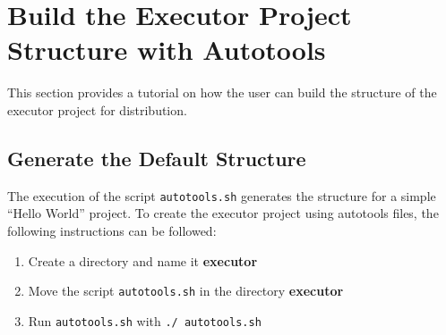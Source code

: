 
\section{Build the Executor Project Structure with Autotools}\label{section:build}
This section provides a tutorial on  how the user can build the structure of the executor project for distribution.
\subsection{Generate the Default Structure}\label{subsection:default}

The execution of the script \texttt{autotools.sh} generates the structure for a simple ``Hello World'' project. To create the executor project using autotools files, the following instructions can be followed:
\begin{enumerate}
 \item Create a directory and name it \textbf{executor}
 \item Move the script \texttt{autotools.sh} in the directory \textbf{executor}
 \item Run \texttt{autotools.sh} with \texttt{./ autotools.sh}
\end{enumerate}


